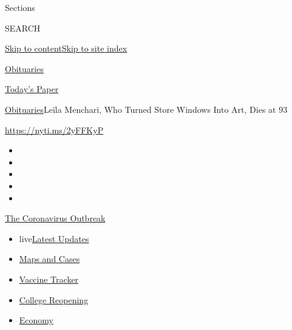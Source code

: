 Sections

SEARCH

\protect\hyperlink{site-content}{Skip to
content}\protect\hyperlink{site-index}{Skip to site index}

\href{https://www.nytimes.com/section/obituaries}{Obituaries}

\href{https://myaccount.nytimes.com/auth/login?response_type=cookie\&client_id=vi}{}

\href{https://www.nytimes.com/section/todayspaper}{Today's Paper}

\href{/section/obituaries}{Obituaries}\textbar{}Leïla Menchari, Who
Turned Store Windows Into Art, Dies at 93

\url{https://nyti.ms/2yFFKyP}

\begin{itemize}
\item
\item
\item
\item
\item
\end{itemize}

\href{https://www.nytimes.com/news-event/coronavirus?action=click\&pgtype=Article\&state=default\&region=TOP_BANNER\&context=storylines_menu}{The
Coronavirus Outbreak}

\begin{itemize}
\tightlist
\item
  live\href{https://www.nytimes.com/2020/08/03/world/coronavirus-covid-19.html?action=click\&pgtype=Article\&state=default\&region=TOP_BANNER\&context=storylines_menu}{Latest
  Updates}
\item
  \href{https://www.nytimes.com/interactive/2020/us/coronavirus-us-cases.html?action=click\&pgtype=Article\&state=default\&region=TOP_BANNER\&context=storylines_menu}{Maps
  and Cases}
\item
  \href{https://www.nytimes.com/interactive/2020/science/coronavirus-vaccine-tracker.html?action=click\&pgtype=Article\&state=default\&region=TOP_BANNER\&context=storylines_menu}{Vaccine
  Tracker}
\item
  \href{https://www.nytimes.com/2020/08/02/us/covid-college-reopening.html?action=click\&pgtype=Article\&state=default\&region=TOP_BANNER\&context=storylines_menu}{College
  Reopening}
\item
  \href{https://www.nytimes.com/live/2020/08/03/business/stock-market-today-coronavirus?action=click\&pgtype=Article\&state=default\&region=TOP_BANNER\&context=storylines_menu}{Economy}
\end{itemize}

